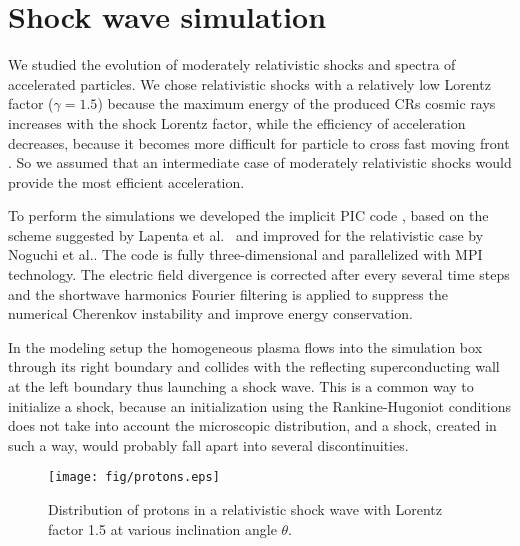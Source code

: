 \documentclass[a4paper]{jpconf}
\begin{document}
\section{Shock wave simulation}
We studied the evolution of moderately relativistic shocks and spectra of accelerated particles. We chose relativistic shocks with a relatively low Lorentz factor ($\gamma=1.5$) because the maximum energy of the produced CRs cosmic rays increases with the shock Lorentz factor, while the efficiency of acceleration decreases, 
because it becomes more difficult for particle to cross fast moving front
%
\cite{Ellison2013}. So we assumed that an intermediate case of moderately relativistic shocks would provide the most efficient acceleration.

To perform the simulations we developed the implicit PIC code \cite{Romansky2016}, based on the scheme suggested by Lapenta et al.~\cite{Lapenta2006} and improved for the relativistic case by Noguchi et al.\cite{Noguchi2007}.
The code is fully three-dimensional and parallelized with MPI technology. The electric field divergence is corrected
after every several time steps and 
the shortwave harmonics Fourier filtering is applied
to suppress the numerical Cherenkov instability and improve energy conservation.

In the modeling setup the homogeneous plasma flows into the simulation box through its right boundary
and collides with the reflecting superconducting wall at the left boundary thus launching a shock wave. This  is a common way to initialize a shock, because an initialization using the Rankine-Hugoniot conditions does not take into account the microscopic distribution, and a shock, created in such a way, would probably fall apart into several discontinuities.

\begin{figure}[h!]
	\centering
	\texttt{[image: fig/protons.eps]} 
	\caption{Distribution of protons in a relativistic shock wave with Lorentz factor 1.5 at various inclination angle $\theta$.}
	\label{protons}
\end{figure} 
\end{document}
